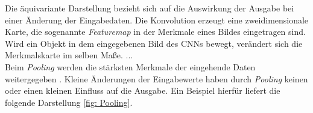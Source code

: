 		Die äquivariante Darstellung bezieht sich auf die Auswirkung der Ausgabe bei einer Änderung der Eingabedaten. Die Konvolution erzeugt eine zweidimensionale Karte, die sogenannte \textit{Featuremap} in der Merkmale eines Bildes eingetragen sind. Wird ein Objekt in dem eingegebenen Bild des CNNs bewegt, verändert sich die Merkmalskarte im selben Maße. ...\\
		
		
		Beim \textit{Pooling} werden die stärksten Merkmale der eingehende Daten weitergegeben \cite{deeplearning}. Kleine Änderungen der Eingabewerte haben durch \textit{Pooling} keinen oder einen kleinen Einfluss auf die Ausgabe. Ein Beispiel hierfür liefert die folgende Darstellung \ref{fig: Pooling}.\\
		

